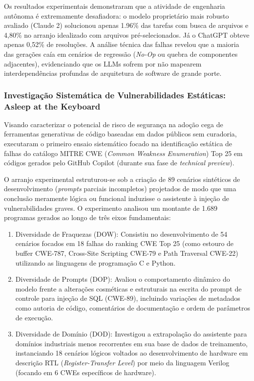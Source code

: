 Os resultados experimentais demonstraram que a atividade de engenharia autônoma é extremamente desafiadora: o modelo proprietário mais robusto avaliado (Claude 2) solucionou apenas 1.96\% das tarefas com busca de arquivos e 4,80\% no arranjo idealizado com arquivos pré-selecionados. Já o ChatGPT obteve apenas 0,52\% de resoluções. A análise técnica das falhas revelou que a maioria das gerações caía em cenários de regressão (\textit{No-Op} ou quebra de componentes adjacentes), evidenciando que os LLMs sofrem por não mapearem interdependências profundas de arquitetura de software de grande porte.

\subsubsection{Investigação Sistemática de Vulnerabilidades Estáticas: Asleep at the Keyboard \cite{pearce2022}}

Visando caracterizar o potencial de risco de segurança na adoção cega de ferramentas generativas de código baseadas em dados públicos sem curadoria,  executaram o primeiro ensaio sistemático focado na identificação estática de falhas do catálogo MITRE CWE (\textit{Common Weakness Enumeration}) Top 25 em códigos gerados pelo GitHub Copilot (durante sua fase de \textit{technical preview}).

O arranjo experimental estruturou-se sob a criação de 89 cenários sintéticos de desenvolvimento (\textit{prompts} parciais incompletos) projetados de modo que uma conclusão meramente lógica ou funcional induzisse o assistente à injeção de vulnerabilidades graves. O experimento analisou um montante de 1.689 programas gerados ao longo de três eixos fundamentais:
\begin{enumerate}
    \item Diversidade de Fraquezas (DOW): Consistiu no desenvolvimento de 54 cenários focados em 18 falhas do ranking CWE Top 25 (como estouro de buffer CWE-787, Cross-Site Scripting CWE-79 e Path Traversal CWE-22) utilizando as linguagens de programação C e Python.
    \item Diversidade de Prompts (DOP): Avaliou o comportamento dinâmico do modelo frente a alterações cosméticas e estruturais na escrita do prompt de controle para injeção de SQL (CWE-89), incluindo variações de metadados como autoria de código, comentários de documentação e ordem de parâmetros de execução.
    \item Diversidade de Domínio (DOD): Investigou a extrapolação do assistente para domínios industriais menos recorrentes em sua base de dados de treinamento, instanciando 18 cenários lógicos voltados ao desenvolvimento de hardware em descrição RTL (\textit{Register-Transfer Level}) por meio da linguagem Verilog (focando em 6 CWEs específicos de hardware).
\end{enumerate}


